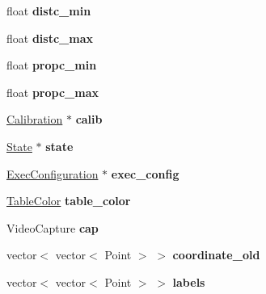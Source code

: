 \begin{DoxyCompactItemize}
\item 
\hypertarget{classvision_a55d7e213d59603d7ac47a52b84109809}{float {\bfseries distc\-\_\-min}}\label{classvision_a55d7e213d59603d7ac47a52b84109809}

\item 
\hypertarget{classvision_a20c85db3ec02873d653e5bb9b10c39ff}{float {\bfseries distc\-\_\-max}}\label{classvision_a20c85db3ec02873d653e5bb9b10c39ff}

\item 
\hypertarget{classvision_a91f86b737be2111668b21ee63797f401}{float {\bfseries propc\-\_\-min}}\label{classvision_a91f86b737be2111668b21ee63797f401}

\item 
\hypertarget{classvision_a6aeb3bfbd1eebe0a8e1d722eb8c21891}{float {\bfseries propc\-\_\-max}}\label{classvision_a6aeb3bfbd1eebe0a8e1d722eb8c21891}

\item 
\hypertarget{classvision_a7e5420798a60cb8b48e8a29b786f1683}{\hyperlink{structcommon_1_1Calibration}{Calibration} $\ast$ {\bfseries calib}}\label{classvision_a7e5420798a60cb8b48e8a29b786f1683}

\item 
\hypertarget{classvision_a66846efba8a3de237d1a3c153ff1b812}{\hyperlink{structcommon_1_1State}{State} $\ast$ {\bfseries state}}\label{classvision_a66846efba8a3de237d1a3c153ff1b812}

\item 
\hypertarget{classvision_a7929fc67b174048c25f34c064e6931ea}{\hyperlink{structcommon_1_1ExecConfiguration}{Exec\-Configuration} $\ast$ {\bfseries exec\-\_\-config}}\label{classvision_a7929fc67b174048c25f34c064e6931ea}

\item 
\hypertarget{classvision_a992a907eaa83feaa4fdec5eec0a3c978}{\hyperlink{structcommon_1_1TableColor}{Table\-Color} {\bfseries table\-\_\-color}}\label{classvision_a992a907eaa83feaa4fdec5eec0a3c978}

\item 
\hypertarget{classvision_a6ce35c3216f36f741a0fab54e815d820}{Video\-Capture {\bfseries cap}}\label{classvision_a6ce35c3216f36f741a0fab54e815d820}

\item 
\hypertarget{classvision_a3d8aa1ce75f36f4bb0c2270100a1a0df}{vector$<$ vector$<$ Point $>$ $>$ {\bfseries coordinate\-\_\-old}}\label{classvision_a3d8aa1ce75f36f4bb0c2270100a1a0df}

\item 
\hypertarget{classvision_a2a7fa3ec56b81484eb06c0f5c068365a}{vector$<$ vector$<$ Point $>$ $>$ {\bfseries labels}}\label{classvision_a2a7fa3ec56b81484eb06c0f5c068365a}


\end{DoxyCompactItemize}
